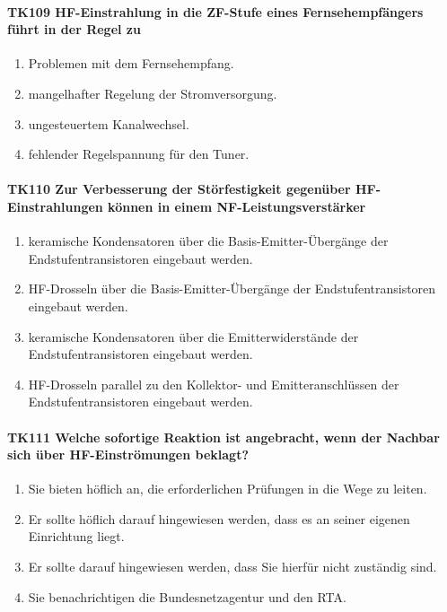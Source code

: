 \documentclass[8pt]{article}
\begin{document}
\paragraph*{TK109 HF-Einstrahlung in die ZF-Stufe eines Fernsehempfängers führt in der Regel zu} 
\begin{enumerate}[nolistsep,label=\Alph*]
\item Problemen mit dem Fernsehempfang.
\item mangelhafter Regelung der Stromversorgung.
\item ungesteuertem Kanalwechsel.
\item fehlender Regelspannung für den Tuner.
\end{enumerate}

\paragraph*{TK110 Zur Verbesserung der Störfestigkeit gegenüber HF-Einstrahlungen können in einem NF-Leistungsverstärker}
\begin{enumerate}[nolistsep,label=\Alph*]
\item keramische Kondensatoren über die Basis-Emitter-Übergänge der Endstufentransistoren eingebaut werden.
\item HF-Drosseln über die Basis-Emitter-Übergänge der Endstufentransistoren eingebaut werden.
\item keramische Kondensatoren über die Emitterwiderstände der Endstufentransistoren eingebaut werden. 
\item HF-Drosseln parallel zu den Kollektor- und Emitteranschlüssen der Endstufentransistoren eingebaut werden.
\end{enumerate}

\paragraph*{TK111 Welche sofortige Reaktion ist angebracht, wenn der Nachbar sich über HF-Einströmungen beklagt?}
\begin{enumerate}[nolistsep,label=\Alph*]
\item Sie bieten höflich an, die erforderlichen Prüfungen in die Wege zu leiten.
\item Er sollte höflich darauf hingewiesen werden, dass es an seiner eigenen Einrichtung liegt.
\item Er sollte darauf hingewiesen werden, dass Sie hierfür nicht zuständig sind.
\item Sie benachrichtigen die Bundesnetzagentur und den RTA.
\end{enumerate}
\end{document}
